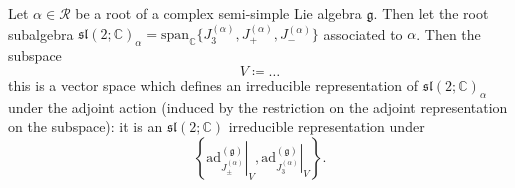 \begin{proposition}
    Let \(\alpha \in \mathcal{R}\) be a root of a complex semi-simple Lie algebra \(\mathfrak{g}\). Then let the root subalgebra \(\mathfrak{sl}(2; \mathbb{C})_{\alpha} = \mathrm{span}_{\mathbb{C}}\{J_3^{(\alpha)}, J_+^{(\alpha)}, J_-^{(\alpha)}\}\) associated to \(\alpha\). Then the subspace
    \[
        V\coloneqq\dots
    \]
    this is a vector space which defines an irreducible representation of \(\mathfrak{sl}(2; \mathbb{C})_{\alpha}\) under the adjoint action (induced by the restriction on the adjoint representation on the subspace): it is an \(\mathfrak{sl}(2; \mathbb{C})\) irreducible representation under
    \[
        \left\{\left. \mathrm{ad}^{(\mathfrak{g})}_{J_\pm^{(\alpha)}}\right|_V , \left. \mathrm{ad}^{(\mathfrak{g})}_{J_3^{(\alpha)}}\right|_V \right\}.
    \]
\end{proposition}

